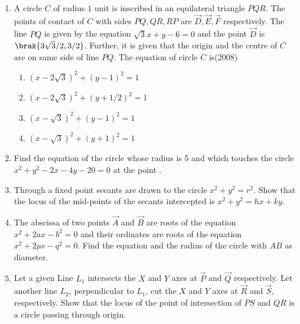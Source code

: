 \begin{enumerate}
\begin{enumerate}
\item A line $L'$ through $\vec{A}$ is drawn parallel to $BD$. Point $S$ moves such that its distances from the line $BD$ and the vertex $\vec{A}$ are equal. If locus of $S$ cuts $L'$ at $T_2$ and $T_3$ and $AC$ at $T_1$, then area of $\Delta T_1T_2T_3$ is
%
\begin{multicols}{4}
\begin{enumerate}
\item $1/2$ sq.units
\item $2/3$ sq.units
\item $1$ sq.units
\item $2$ sq.units
\end{enumerate}
\end{multicols}
\end{enumerate}
%
\item A circle $C$ of radius $1$ unit is inscribed in an equilateral triangle $PQR$. The points of contact of $C$ with sides $PQ, QR, RP$ are $\vec{D}, \vec{E}, \vec{F}$ respectively. The line $PQ$ is given by the equation $\sqrt{3}x+y-6=0$ and the point $\vec{D}$ is $\brak{3\sqrt{3}/2,  3/2}$. Further, it is given that the origin and the centre of $C$ are on same side of line $PQ$.
%
The equation of circle $C$ is\hfill(2008)
\begin{multicols}{2}
\begin{enumerate}
\item $(x-2\sqrt{3})^2 + (y-1)^2=1$
\item $(x-2\sqrt{3})^2 + (y+1/2)^2=1$
\item $(x-\sqrt{3})^2 + (y-1)^2=1$
\item $(x-\sqrt{3})^2 + (y+1)^2=1$
\end{enumerate}
\end{multicols}
\item Find the equation of the circle whose radius is 5 and which touches the circle $x^2+y^2-2x-4y-20=0$ at the point .
%
\hfill {}
\item Through a fixed point  secants are drawn to the circle $x^2+y^2=r^2$. Show that the locus of the mid-points of the secants intercepted is $x^2+y^2=hx+ky$.
%
\hfill {}
\item The abscissa of two points $\vec{A}$ and $\vec{B}$ are roots of the equation $x^2+2ax-b^2=0$ and their ordinates are roots of the equation $x^2+2px-q^2=0$. Find the equation and the radius of the circle with $AB$ as diameter.
%
\hfill {}
\item Let a given Line $L_1$ intersects the $X$ and $Y$ axes at $\vec{P}$ and $\vec{Q}$ respectively. Let another line $L_2$,  perpendicular to $L_1$,  cut the $X$ and $Y$ axes at $\vec{R}$ and $\vec{S}$,  respectively. Show that the locus of the point of intersection of $PS$ and $QR$ is a circle passing through origin.

\end{enumerate}
